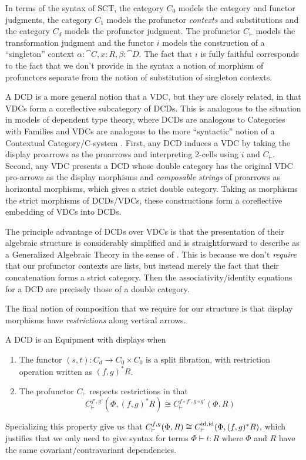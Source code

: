 \documentclass{llncs}
\begin{document}
In terms of the syntax of SCT, the category $C_0$ models the category
and functor judgments, the category $C_1$ models the profunctor
\emph{contexts} and substitutions and the category $C_d$ models the
profunctor judgment. The profunctor $C_\vdash$ models the
transformation judgment and the functor $i$ models the construction of
a ``singleton'' context $\alpha:\cat C,x:R,\beta:\cat D$. The fact
that $i$ is fully faithful corresponds to the fact that we don't
provide in the syntax a notion of morphism of profunctors separate
from the notion of substitution of singleton contexts.

A DCD is a more general notion that a VDC, but they are closely
related, in that VDCs form a coreflective subcategory of DCDs. This is
analogous to the situation in models of dependent type theory, where
DCDs are analogous to Categories with Families \cite{cwfs,natmodels}
and VDCs are analogous to the more ``syntactic'' notion of a
Contextual Category/C-system \cite{ctxcat,csystem}. First, any DCD
induces a VDC by taking the display proarrows as the proarrows and
interpreting 2-cells using $i$ and $C_\vdash$.  Second, any VDC
presents a DCD whose double category has the original VDC pro-arrows
as the display morphisms and \emph{composable strings} of proarrows as
horizontal morphisms, which gives a strict double category.
%
Taking as morphisms the strict morphisms of DCDs/VDCs, these
constructions form a coreflective embedding of VDCs into DCDs.

The principle advantage of DCDs over VDCs is that the presentation of
their algebraic structure is considerably simplified and is
straightforward to describe as a Generalized Algebraic Theory in the
sense of \citet{CartmellGAT}. This is because we don't \emph{require}
that our profunctor contexts are lists, but instead merely the fact
that their concatenation forms a strict category. Then the
associativity/identity equations for a DCD are precisely those of a
double category.

The final notion of composition that we require for our structure is
that display morphisms have \emph{restrictions} along vertical arrows.

\begin{definition}
  A DCD is an Equipment with displays when
  \begin{enumerate}
  \item The functor $(s,t) : C_d \to C_0 \times C_0$ is a split
    fibration, with restriction operation written as $(f,g)^*R$.
  \item The profunctor $C_\vdash$ respects restrictions in that
    \[ C_\vdash^{f',g'}(\Phi, (f,g)^*R) \cong C_\vdash^{f\circ f',g\circ g'}(\Phi, R) \]
  \end{enumerate}
\end{definition}
Specializing this property give us that $C_\vdash^{f,g}(\Phi,R) \cong
C_\vdash^{\textrm{id},\textrm{id}}(\Phi,(f,g)^*R)$, which justifies that we only need
to give syntax for terms $\Phi \vdash t : R$ where $\Phi$ and $R$ have
the same covariant/contravariant dependencies.
\end{document}
